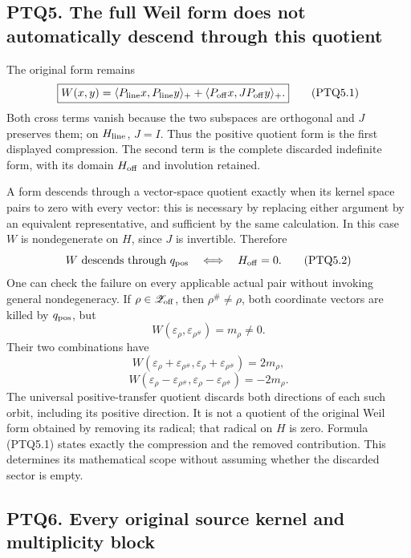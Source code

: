 \subsection{PTQ5. The full Weil form does not automatically descend
through this
quotient}\label{ptq5.-the-full-weil-form-does-not-automatically-descend-through-this-quotient}

The original form remains \[
\boxed{W(x,y)=
\langle P_{\rm line}x,P_{\rm line}y\rangle_+
+\langle P_{\rm off}x,J P_{\rm off}y\rangle_+.}
\tag{PTQ5.1}
\] Both cross terms vanish because the two subspaces are orthogonal and
\(J\) preserves them; on \(H_{\rm line}\), \(J=I\). Thus the positive
quotient form is the first displayed compression. The second term is the
complete discarded indefinite form, with its domain \(H_{\rm off}\) and
involution retained.

A form descends through a vector-space quotient exactly when its kernel
space pairs to zero with every vector: this is necessary by replacing
either argument by an equivalent representative, and sufficient by the
same calculation. In this case \(W\) is nondegenerate on \(H\), since
\(J\) is invertible. Therefore \[
W\text{ descends through }q_{\rm pos}
\quad\Longleftrightarrow\quad H_{\rm off}=0.
\tag{PTQ5.2}
\] One can check the failure on every applicable actual pair without
invoking general nondegeneracy. If \(\rho\in\mathscr Z_{\rm off}\), then
\(\rho^\#\ne\rho\), both coordinate vectors are killed by
\(q_{\rm pos}\), but \[
W(\varepsilon_\rho,\varepsilon_{\rho^\#})=m_\rho\ne0.
\tag{PTQ5.3}
\] Their two combinations have \[
W(\varepsilon_\rho+\varepsilon_{\rho^\#},
\varepsilon_\rho+\varepsilon_{\rho^\#})=2m_\rho,
\] \[
W(\varepsilon_\rho-\varepsilon_{\rho^\#},
\varepsilon_\rho-\varepsilon_{\rho^\#})=-2m_\rho.
\tag{PTQ5.4}
\] The universal positive-transfer quotient discards both directions of
each such orbit, including its positive direction. It is not a quotient
of the original Weil form obtained by removing its radical; that radical
on \(H\) is zero. Formula (PTQ5.1) states exactly the compression and
the removed contribution. This determines its mathematical scope without
assuming whether the discarded sector is empty.

\subsection{PTQ6. Every original source kernel and multiplicity
block}\label{ptq6.-every-original-source-kernel-and-multiplicity-block}

